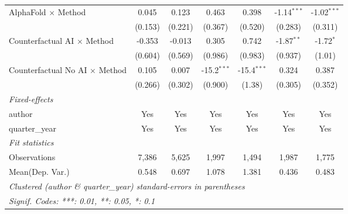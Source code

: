 \begin{tabular}{lcccccc}
   AlphaFold $\times$ Method             & 0.045         & 0.123         & 0.463         & 0.398         & -1.14$^{***}$ & -1.02$^{***}$\\   
                                         & (0.153)       & (0.221)       & (0.367)       & (0.520)       & (0.283)       & (0.311)\\   
   Counterfactual AI $\times$ Method     & -0.353        & -0.013        & 0.305         & 0.742         & -1.87$^{**}$  & -1.72$^{*}$\\   
                                         & (0.604)       & (0.569)       & (0.986)       & (0.983)       & (0.937)       & (1.01)\\   
   Counterfactual No AI $\times$ Method  & 0.105         & 0.007         & -15.2$^{***}$ & -15.4$^{***}$ & 0.324         & 0.387\\   
                                         & (0.266)       & (0.302)       & (0.900)       & (1.38)        & (0.305)       & (0.352)\\   
   \midrule
   \emph{Fixed-effects}\\
   author                                & Yes           & Yes           & Yes           & Yes           & Yes           & Yes\\  
   quarter\_year                         & Yes           & Yes           & Yes           & Yes           & Yes           & Yes\\  
   \midrule
   \emph{Fit statistics}\\
   Observations                          & 7,386         & 5,625         & 1,997         & 1,494         & 1,987         & 1,775\\  
Mean(Dep. Var.) & 0.548 & 0.697 & 1.078 & 1.381 & 0.436 & 0.483 \\
   \midrule \midrule
   \multicolumn{7}{l}{\emph{Clustered (author \& quarter\_year) standard-errors in parentheses}}\\
   \multicolumn{7}{l}{\emph{Signif. Codes: ***: 0.01, **: 0.05, *: 0.1}}\\
\end{tabular}
\par\endgroup
